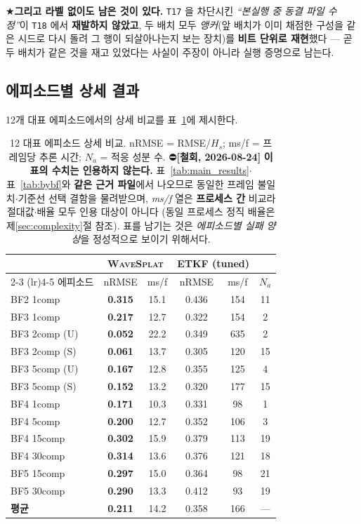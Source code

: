 \documentclass[11pt]{report}
\numberwithin{equation}{chapter}
\numberwithin{figure}{chapter}
\numberwithin{table}{chapter}
\newcommand{\WS}{\textsc{WaveSplat}}
\begin{document}
★\textbf{그리고 라벨 없이도 남은 것이 있다.} \texttt{T17} 을 차단시킨 \emph{``본실행 중
동결 파일 수정''}이 \texttt{T18} 에서 \textbf{재발하지 않았고}, 두 배치 모두
\emph{앵커}(앞 배치가 이미 채점한 구성을 같은 시드로 다시 돌려 그 행이 되살아나는지 보는
장치)를 \textbf{비트 단위로 재현}했다 --- 곧 두 배치가 같은 것을 재고 있었다는 사실이
주장이 아니라 실행 증명으로 남는다.

\subsection{에피소드별 상세 결과}
\label{sec:per_episode}

12개 대표 에피소드에서의 상세 비교를 표~\ref{tab:per_episode}에 제시한다.

\begin{table}[htbp]
\centering
\caption{12 대표 에피소드 상세 비교. nRMSE = RMSE/$H_s$; ms/f = 프레임당 추론 시간;
$N_a$ = 적응 성분 수.
⛔\textbf{[철회, 2026-08-24]} \textbf{이 표의 수치는 인용하지 않는다.}
표~\ref{tab:main_results}$\cdot$표~\ref{tab:bybf}와 \textbf{같은 근거 파일}에서 나오므로
동일한 프레임 불일치$\cdot$기준선 선택 결함을 물려받으며, \emph{ms/f} 열은
\textbf{프로세스 간} 비교라 절대값$\cdot$배율 모두 인용 대상이 아니다
(동일 프로세스 정직 배율은 제\ref{sec:complexity}절 참조).
표를 남기는 것은 \emph{에피소드별 실패 양상}을 정성적으로 보이기 위해서다.}
\label{tab:per_episode}
\small
\begin{tabular}{lccccc}
\toprule
& \multicolumn{2}{c}{\WS{}} & \multicolumn{2}{c}{ETKF (tuned)} & \\
\cmidrule(lr){2-3} \cmidrule(lr){4-5}
에피소드 & nRMSE & ms/f & nRMSE & ms/f & $N_a$ \\
\midrule
BF2 1comp     & \textbf{0.315} & 15.1 & 0.436 & 154 & 11 \\
BF3 1comp     & \textbf{0.217} & 12.7 & 0.322 & 154 &  2 \\
BF3 2comp (U) & \textbf{0.052} & 22.2 & 0.349 & 635 &  2 \\
BF3 2comp (S) & \textbf{0.061} & 13.7 & 0.305 & 120 & 15 \\
BF3 5comp (U) & \textbf{0.167} & 12.8 & 0.355 & 125 &  4 \\
BF3 5comp (S) & \textbf{0.152} & 13.2 & 0.320 & 177 & 15 \\
BF4 1comp     & \textbf{0.171} & 10.3 & 0.331 &  98 &  1 \\
BF4 5comp     & \textbf{0.200} & 12.7 & 0.352 & 106 &  3 \\
BF4 15comp    & \textbf{0.302} & 15.9 & 0.379 & 113 & 19 \\
BF4 30comp    & \textbf{0.314} & 13.6 & 0.376 & 121 & 18 \\
BF5 15comp    & \textbf{0.297} & 15.0 & 0.364 &  98 & 21 \\
BF5 30comp    & \textbf{0.290} & 13.3 & 0.412 &  93 & 19 \\
\midrule
\textbf{평균}  & \textbf{0.211} & 14.2 & 0.358 & 166 & --- \\
\bottomrule
\end{tabular}
\end{table}
\end{document}
